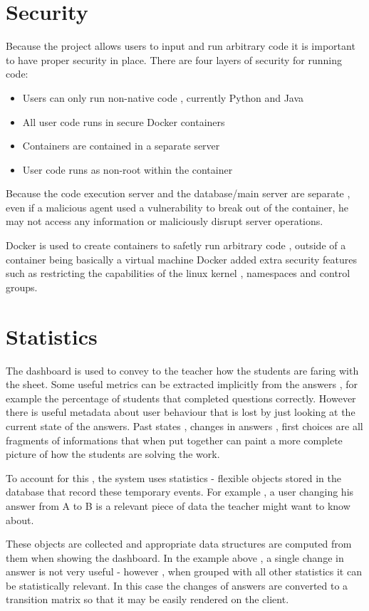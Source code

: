 \section{Security}
Because the project allows users to input and run arbitrary code it is important to have proper security in place. There are four layers of security for running code:
\begin{itemize}
\item Users can only run non-native code , currently Python and Java
\item 	All user code runs in secure Docker containers
\item	Containers are contained in a separate server
\item User code runs as non-root within the container
\end{itemize}
Because the code execution server and the database/main server are separate , even if a malicious agent used a vulnerability to break out of the container, he may not access any information or maliciously disrupt server operations.

Docker is used to create containers to safetly run arbitrary code , outside of a container being basically a virtual machine Docker added extra security features \cite{dockersecurity} such as restricting the capabilities of the linux kernel , namespaces and control groups.

\section{Statistics}
The dashboard is used to convey to the teacher how the students are faring with the sheet. Some useful metrics can be extracted implicitly from the answers , for example the percentage of students that completed questions correctly. However there is useful metadata about user behaviour that is lost by just looking at the current state of the answers. Past states , changes in answers , first choices are all fragments of informations that when put together can paint a more complete picture of how the students are solving the work.

To account for this , the system uses statistics - flexible objects stored in the database that record these temporary events. For example , a user changing his answer from A to B is a relevant piece of data the teacher might want to know about.

These objects are collected and appropriate data structures are computed from them when showing the dashboard. In the example above , a single change in answer is not very useful - however , when grouped with all other statistics it can be statistically relevant. In this case the changes of answers are converted to a transition matrix so that it may be easily rendered on the client.

